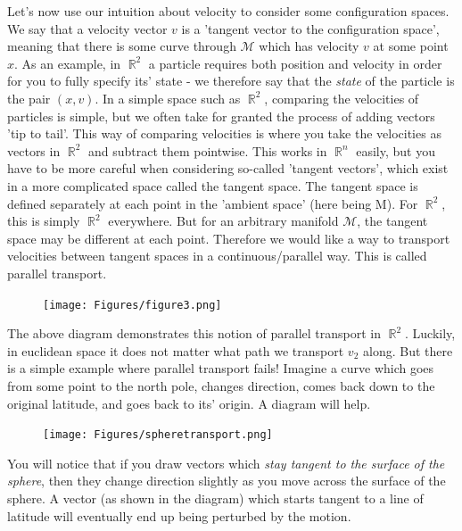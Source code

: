 \documentclass{article}
\DeclareMathOperator{\RR}{\mathbb{R}}
\begin{document}
Let's now use our intuition about velocity to consider some configuration spaces. We say that a velocity vector $v$ is a 'tangent vector to the configuration space', meaning that there is some curve through $\mathcal{M}$ which has velocity $v$ at some point $x$. As an example, in $\RR^2$ a particle requires both position and velocity in order for you to fully specify its' state - we therefore say that the \textit{state} of the particle is the pair $(x,v)$. In a simple space such as $\RR^2$, comparing the velocities of particles is simple, but we often take for granted the process of adding vectors 'tip to tail'. This way of comparing velocities is where you take the velocities as vectors in $\RR^2$ and subtract them pointwise. This works in $\RR^n$ easily, but you have to be more careful when considering so-called 'tangent vectors', which exist in a more complicated space called the tangent space. The tangent space is defined separately at each point in the 'ambient space' (here being \textrm{M}). For $\RR^2$, this is simply $\RR^2$ everywhere. But for an arbitrary manifold $\mathcal{M}$, the tangent space may be different at each point. Therefore we would like a way to transport velocities between tangent spaces in a continuous/parallel way. This is called parallel transport.

\begin{figure}[ht]
    \centering
    \texttt{[image: Figures/figure3.png]}
    \caption*{}
    \label{fig:21}
\end{figure}
The above diagram demonstrates this notion of parallel transport in $\RR^2$. Luckily, in euclidean space it does not matter what path we transport $v_2$ along. But there is a simple example where parallel transport fails! Imagine a curve which goes from some point to the north pole, changes direction, comes back down to the original latitude, and goes back to its' origin. A diagram will help.
\begin{figure}[h]
    \centering
    \texttt{[image: Figures/spheretransport.png]}
    \caption*{}
    \label{fig:22}
\end{figure}

You will notice that if you draw vectors which \textit{stay tangent to the surface of the sphere}, then they change direction slightly as you move across the surface of the sphere. A vector (as shown in the diagram) which starts tangent to a line of latitude will eventually end up being perturbed by the motion.
\end{document}
